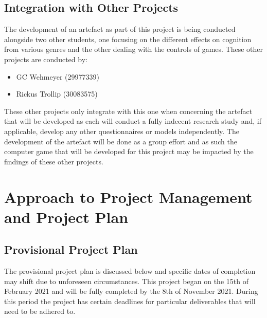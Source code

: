 \subsection{Integration with Other Projects}
The development of an artefact as part of this project is being conducted alongside two other students, one focusing on the different effects on cognition from various genres and the other dealing with the controls of games. These other projects are conducted by:
\begin{itemize}
\item GC Wehmeyer (29977339)
\item Rickus Trollip (30083575)
\end{itemize}
These other projects only integrate with this one when concerning the artefact that will be developed as each will conduct a fully indecent research study and, if applicable, develop any other questionnaires or models independently. The development of the artefact will be done as a group effort and as such the computer game that will be developed for this project may be impacted by the findings of these other projects.
\pagebreak
\section{Approach to Project Management and Project Plan}
\subsection{Provisional Project Plan}
The provisional project plan is discussed below and specific dates of completion may shift due to unforeseen circumstances. This project began on the 15th of February 2021 and will be fully completed by the 8th of November 2021. During this period the project has certain deadlines for particular deliverables that will need to be adhered to. 

